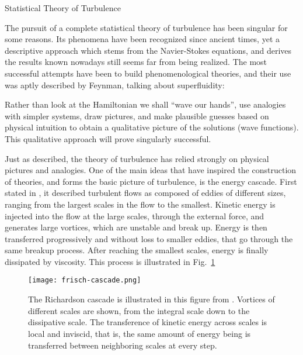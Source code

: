 \begin{chapter}{Statistical Theory of Turbulence}
\label{chap:turb}

\hspace{5 mm}

The pursuit of a complete statistical theory of turbulence
has been singular for some reasons. Its phenomena have been
recognized since ancient times, yet a descriptive
approach which stems from the Navier-Stokes equations,
and derives
the results known nowadays still seems far from being realized.
The most successful attempts have been to build phenomenological
theories, and their use was aptly described by Feynman, talking about
superfluidity:
\begin{displayquote}
Rather than look at the Hamiltonian we shall \enquote{wave our hands},
use analogies
with simpler systems, draw pictures, and make plausible guesses based on physical
intuition to obtain a qualitative picture of the solutions (wave functions). This
qualitative approach will prove singularly successful.
\parencite[p.321]{feynman1972}
\end{displayquote}
Just as described, the theory of turbulence has relied strongly
on physical pictures and analogies.
One of the main ideas that have inspired the construction of theories,
and forms the basic picture of turbulence, is the
energy cascade. First stated in \textcite{richardson1922weather},
it described turbulent flows as composed of eddies of different sizes, ranging
from the largest scales in the flow to the smallest.
Kinetic energy is injected into the flow at the large scales,
through the external force, and generates
large vortices, which are unstable and break up.
Energy is then transferred progressively and without loss to smaller eddies,
that go through the same breakup process.
After reaching the smallest scales, energy is finally dissipated by viscosity. This process is illustrated in Fig.~\ref{fig:cascade}

\begin{figure}[ht]
    \centering
    \texttt{[image: frisch-cascade.png]}
    \caption[An illustration of the Richardson cascade]
    {The Richardson cascade is illustrated in this figure from \textcite{frisch1995}. Vortices of different scales are shown, from the integral scale down to the dissipative scale. The transference of kinetic energy across scales is local and inviscid, that is, the same amount of energy being is transferred between neighboring scales at every step.}
    \label{fig:cascade}
\end{figure}


\end{chapter}
